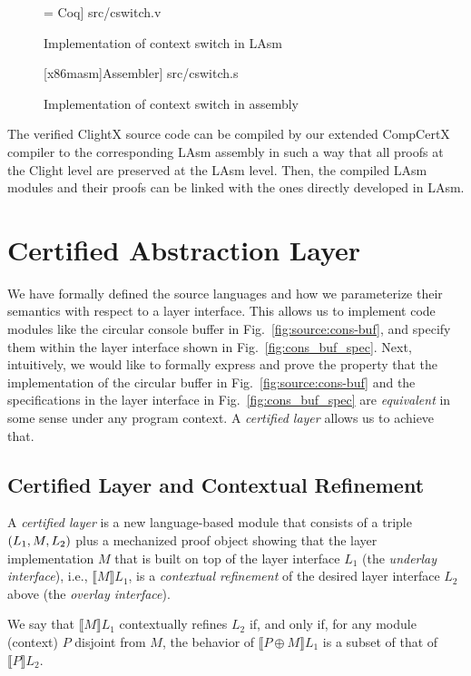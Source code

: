 \begin{figure}
 = Coq] {src/cswitch.v}
\caption{Implementation of context switch in LAsm}
\label{fig:lasm_cswitch}
\end{figure}

\begin{figure}
	{[x86masm]Assembler}] {src/cswitch.s}
	\caption{Implementation of context switch in assembly}
	\label{fig:cswitch}
\end{figure}

The verified ClightX
source code can be compiled by our extended CompCertX compiler
\cite{dscal15} to the corresponding LAsm assembly in such a way that
all proofs at the Clight level are preserved at the LAsm level. Then,
the compiled LAsm modules and their proofs can be linked with the ones
directly developed in LAsm.


\section{Certified Abstraction Layer} 

We have formally defined the source languages and how we parameterize
their semantics with respect to a layer interface. 
This allows us to implement code modules like the circular console
buffer in Fig.~\ref{fig:source:cons-buf}, and specify them
within the layer interface shown in Fig.~\ref{fig:cons_buf_spec}.
Next, intuitively, we would like
to formally express and prove the property that the implementation
of the circular buffer in Fig.~\ref{fig:source:cons-buf} and the specifications
in the layer interface in Fig.~\ref{fig:cons_buf_spec} are {\em equivalent}
in some sense under any program context. 
A {\em certified layer} allows us to achieve that.

\subsection{Certified Layer and Contextual Refinement}

A {\em certified layer} is a new language-based
module that consists of a triple $(L_1,M,L_2)$ plus a mechanized proof
object showing that the layer implementation $M$ that is built on top of the
layer interface $L_1$ (the {\em underlay interface}), i.e.,
$\llbracket{}M\rrbracket{}L_1$, is a {\em contextual refinement} of the
desired layer interface $L_2$ above (the {\em overlay interface}).

\begin{definition}
We say that $\llbracket{}M\rrbracket{}L_1$ contextually refines
$L_2$ if, and only if, for any module (context) $P$ disjoint from $M$,
the behavior of $\llbracket{}{P \oplus M}\rrbracket{}L_1$ is a subset of
that of $\llbracket{}P\rrbracket{}L_2$.
\end{definition}

